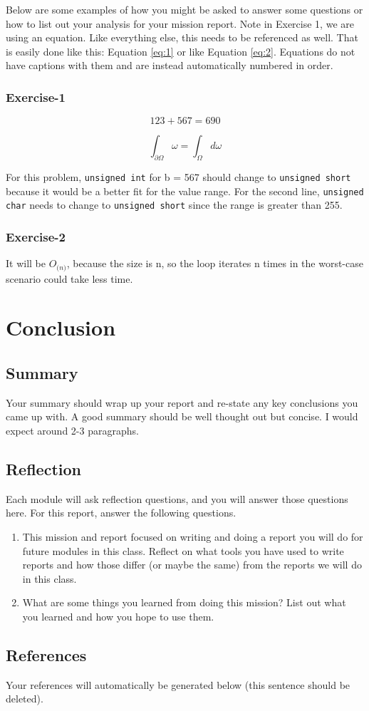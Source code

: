 \documentclass{report}
\begin{document}
Below are some examples of how you might be asked to answer some questions or how to list out your analysis for your mission report. Note in Exercise 1, we are using an equation. Like everything else, this needs to be referenced as well. That is easily done like this: Equation \ref{eq:1} or like Equation \ref{eq:2}. Equations do not have captions with them and are instead automatically numbered in order.
\subsection{Exercise-1}
\begin{equation}
\label{eq:1}
123 + 567 = 690
\end{equation}

\begin{equation}
\label{eq:2}
    \int_{\partial \Omega} \omega = \int_{\Omega} d \omega
\end{equation}

For this problem, \texttt{unsigned int} for b = 567 should change to \texttt{unsigned short} because it would be a better fit for the value range. For the second line, \texttt{unsigned char} needs to change to \texttt{unsigned short} since the range is greater than 255.

\subsection{Exercise-2}
It will be $O{_{\mathrm(n)}}$, because the size is n, so the loop iterates n times in the worst-case scenario could take less time.

\chapter{Conclusion}
\section{Summary}
Your summary should wrap up your report and re-state any key conclusions you came up with. A good summary should be well thought out but concise. I would expect around 2-3 paragraphs.
\section{Reflection}
Each module will ask reflection questions, and you will answer those questions here. For this report, answer the following questions.

\begin{enumerate}
    \item This mission and report focused on writing and doing a report you will do for future modules in this class. Reflect on what tools you have used to write reports and how those differ (or maybe the same) from the reports we will do in this class.
    \item What are some things you learned from doing this mission? List out what you learned and how you hope to use them.
\end{enumerate}
\section{References}
Your references will automatically be generated below (this sentence should be deleted).
\printbibliography[heading=subbibintoc]
\end{document}
